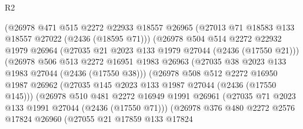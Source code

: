 \begin{lexlean}{R2}
\begin{coremodule}
                                (@26978
                                  @471
                                  @515
                                  @2272
                                  @22933
                                  @18557
                                  @26965
                                  (@27013 @71 @18583 @133 @18557 @27022 (@2436 (@18595 @71)))
                                  (@26978
                                    @504
                                    @514
                                    @2272
                                    @22932
                                    @1979
                                    @26964
                                    (@27035 @21 @2023 @133 @1979 @27044 (@2436 (@17550 @21)))
                                    (@26978
                                      @506
                                      @513
                                      @2272
                                      @16951
                                      @1983
                                      @26963
                                      (@27035 @38 @2023 @133 @1983 @27044 (@2436 (@17550 @38)))
                                      (@26978
                                        @508
                                        @512
                                        @2272
                                        @16950
                                        @1987
                                        @26962
                                        (@27035 @145 @2023 @133 @1987 @27044 (@2436 (@17550 @145)))
                                        (@26978
                                          @510
                                          @481
                                          @2272
                                          @16949
                                          @1991
                                          @26961
                                          (@27035 @71 @2023 @133 @1991 @27044 (@2436 (@17550 @71)))
                                          (@26978
                                            @376
                                            @480
                                            @2272
                                            @2576
                                            @17824
                                            @26960
                                            (@27055
                                              @21
                                              @17859
                                              @133
                                              @17824

\end{coremodule}
\end{lexlean}
